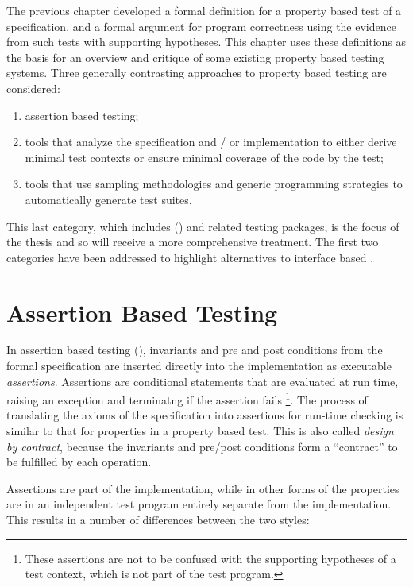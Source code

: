 The previous chapter developed 
a formal definition for a property based test of a specification,
and a formal argument for program correctness 
using the evidence from such tests with supporting hypotheses.
This chapter uses these definitions as the basis for
an overview and critique of some existing property based testing systems.
Three generally contrasting approaches to property based testing are considered:

\begin{enumerate}
\item assertion based testing;
\item tools that analyze the specification and / or implementation to 
either derive minimal test contexts or ensure minimal coverage of the code by the test;
\item tools that use sampling methodologies 
and generic programming strategies to 
automatically generate test suites.
\end{enumerate}
\noindent
This last category,
which includes \QC (\cite{Claessen2000}) and related testing packages,
is the focus of the thesis
and so will receive a more comprehensive treatment.
The first two categories have been addressed 
to highlight alternatives to interface based \pbt.

\section{Assertion Based Testing }
In assertion based testing (\cite{Hoare1969}),
invariants and pre and post conditions from the formal specification
are inserted directly into the implementation as executable \emph{assertions}.
Assertions are conditional statements that are evaluated at run time, 
raising an exception and terminatng if the assertion fails
\footnote{These assertions are not to be confused with 
the supporting hypotheses of a test context,
which is not part of the test program.}.
The process of translating the axioms of the specification 
into assertions for run-time checking is 
similar to that for properties in a property based test.
This is also called \emph{design by contract},
because the invariants and pre/post conditions form a ``contract'' to be fulfilled by each operation.

Assertions  are part of the implementation,
while in other forms of \pbt the properties are 
in an independent test program entirely separate from the implementation.
This results in a number of differences between the two styles:

